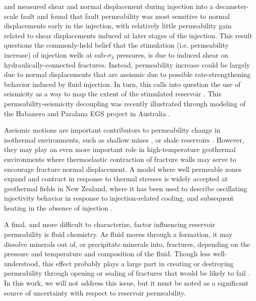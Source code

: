 \citet{Guglielmi_2015} and \citet{cappa2019stabilization} measured shear and normal displacement during injection into a decameter-scale fault and found that fault permeability was most sensitive to normal displacements early in the injection, with relatively little permeability gain related to shear displacements induced at later stages of the injection. This result questions the commonly-held belief that the stimulation (i.e. permeability increase) of injection wells at sub-$\sigma_{3}$ pressures, is due to induced shear on hydraulically-connected fractures. Instead, permeability increase could be largely due to normal displacements that are aseismic due to possible rate-strengthening behavior induced by fluid injection. In turn, this calls into question the use of seismicity as a way to map the extent of the stimulated reservoir \citep[e.g.][]{Fang_2018,Yoon_2014,Dempsey_2015}. This permeability-seismicity decoupling was recently illustrated through modeling of the Habanero and Paralana EGS project in Australia \citep{Riffault_2018}.

Aseismic motions are important contributors to permeability change in isothermal environments, such as shallow mines \citep{Guglielmi_2015}, or shale reservoirs \citep{Das_2011}. However, they may play an even more important role in high-temperature geothermal environments where thermoelastic contraction of fracture walls may serve to encourage fracture normal displacement. A model where well permeable zones expand and contract in response to thermal stresses is widely accepted at geothermal fields in New Zealand, where it has been used to describe oscillating \gls{injectivity} behavior in response to injection-related cooling, and subsequent heating in the absence of injection \citep{grant2013thermal}.

A final, and more difficult to characterize, factor influencing reservoir permeability is fluid chemistry. As fluid moves through a formation, it may dissolve minerals out of, or precipitate minerals into, fractures, depending on the pressure and temperature and composition of the fluid. Though less well-understood, this effect probably plays a large part in creating or destroying permeability through opening or sealing of fractures that would be likely to fail \citep{Clearwater_2015}. In this work, we will not address this issue, but it must be noted as a significant source of uncertainty with respect to reservoir permeability.


